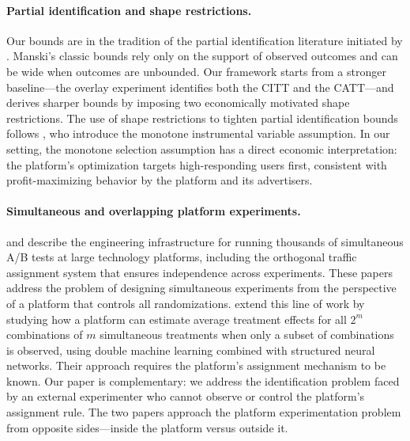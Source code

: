 \documentclass[11pt]{article}
\begin{document}
\paragraph{Partial identification and shape restrictions.}
Our bounds are in the tradition of the partial identification literature
initiated by \citet{manski1990nonparametric}.  Manski's classic bounds rely only
on the support of observed outcomes and can be wide when outcomes are unbounded.
Our framework starts from a stronger baseline---the overlay experiment identifies
both the CITT and the CATT---and derives sharper bounds by imposing two
economically motivated shape restrictions.  The use of shape restrictions to
tighten partial identification bounds follows \citet{manski2000monotone}, who
introduce the monotone instrumental variable assumption.  In our setting, the
monotone selection assumption has a direct economic interpretation: the
platform's optimization targets high-responding users first, consistent with
profit-maximizing behavior by the platform and its advertisers.

\paragraph{Simultaneous and overlapping platform experiments.}
\citet{tang2010overlapping} and \citet{kohavi2020trustworthy} describe the
engineering infrastructure for running thousands of simultaneous A/B tests at
large technology platforms, including the orthogonal traffic assignment system
that ensures independence across experiments.  These papers address the problem
of designing simultaneous experiments from the perspective of a platform that
controls all randomizations.  \citet{ye2025deep} extend this line of work by
studying how a platform can estimate average treatment effects for all $2^m$
combinations of $m$ simultaneous treatments when only a subset of combinations
is observed, using double machine learning combined with structured neural
networks.  Their approach requires the platform's assignment mechanism to be
known.  Our paper is complementary: we address the identification problem faced
by an external experimenter who cannot observe or control the platform's
assignment rule.  The two papers approach the platform experimentation problem
from opposite sides---inside the platform versus outside it.
\end{document}
